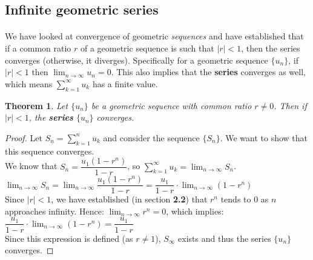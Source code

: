 \documentclass[12pt, a4paper, titlepage, twoside]{article}
\newtheorem*{theorem*}{Theorem}
\begin{document}
	\hfill
	
	\subsection{Infinite geometric series}

	\paragraph{}
	We have looked at convergence of geometric \textit{sequences} and have established that if a common ratio $r$ of a geometric
	sequence is such that $|r| < 1$, then the series converges (otherwise, it diverges). Specifically for a geometric sequence $\{u_n\}$, 
	if $|r| < 1$ then $\displaystyle \lim_{n \to \infty} u_n = 0$. This also implies that the \textbf{series} converges as well, which
	means $\displaystyle \sum_{k=1}^{\infty} u_k$ has a finite value.\\
	
	\begin{pf}
		\begin{theorem*}
			Let $\{u_n\}$ be a geometric sequence with common ratio $r \neq 0$. Then if $|r| < 1$, the \textbf{series} $\{u_n\}$ converges.
		\end{theorem*}
		
		\tcbline
		
		\begin{proof}
			Let $S_n = \displaystyle \sum_{k=1}^n u_k$ and consider the sequence $\{S_n\}$. We want to show that this sequence
			converges.\\
			
			We know that $S_n = \dfrac{u_1 (1 - r^n)}{1 - r}$, so $\displaystyle \sum_{k=1}^\infty u_k = \lim_{n \to \infty} S_n$.\\
			
			$\displaystyle \lim_{n \to \infty} S_n = \lim_{n \to \infty} \dfrac{u_1 (1 - r^n)}{1 - r} = \dfrac{u_1}{1-r} \cdot \lim_{n \to \infty}
			(1-r^n)$\\
			
			Since $|r| < 1$, we have established (in section \textbf{2.2}) that $r^n$ tends to 0 as $n$ approaches infinity. Hence:
			$\displaystyle \lim_{n \to \infty} r^n = 0$, which implies:\\
			
			$\displaystyle \dfrac{u_1}{1-r} \cdot \lim_{n \to \infty} (1-r^n) = \dfrac{u_1}{1-r}$\\
			
			Since this expression is defined (as $r \neq 1$), $S_{\infty}$ exists and thus the series $\{u_n\}$ converges.
		\end{proof}
	\end{pf}
	
\end{document}
